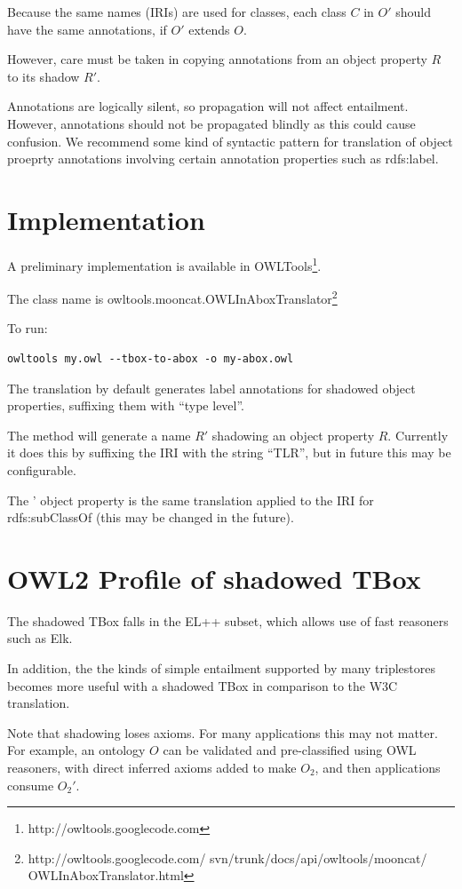 \documentclass{my}
\def\SubClassOf{\pr{SubClassOf}}
\begin{document}
Because the same names (IRIs) are used for classes, each class $C$ in
$O'$ should have the same annotations, if $O'$ extends $O$.

However, care must be taken in copying annotations from an object
property $R$ to its shadow $R'$.

Annotations are logically silent, so propagation will not affect
entailment. However, annotations should not be propagated blindly as
this could cause confusion. We recommend some kind of syntactic
pattern for translation of object proeprty annotations involving
certain annotation properties such as rdfs:label.

\section{Implementation}

A preliminary implementation is available in
OWLTools\footnote{http://owltools.googlecode.com}.

The class name is
owltools.mooncat.OWLInAboxTranslator\footnote{http://owltools.googlecode.com/ 
svn/trunk/docs/api/owltools/mooncat/ OWLInAboxTranslator.html}

To run:
\begin{verbatim}
owltools my.owl --tbox-to-abox -o my-abox.owl
\end{verbatim}

The translation by default generates label annotations for shadowed
object properties, suffixing them with ``type level''.

The method  will generate a name $R'$ shadowing an
object property $R$. Currently it does this by suffixing the IRI with
the string ``TLR'', but in future this may be configurable.

The \SubClassOf' object property is the same translation applied to
the IRI for rdfs:subClassOf (this may be changed in the future).

\section{OWL2 Profile of shadowed TBox}

The shadowed TBox falls in the EL++ subset, which allows use of fast
reasoners such as Elk.

In addition, the the kinds of simple entailment supported by many
triplestores becomes more useful with a shadowed TBox in comparison to
the W3C translation.

Note that shadowing loses axioms. For many applications this may not
matter. For example, an ontology $O$ can be validated and
pre-classified using OWL reasoners, with direct inferred axioms added
to make $O_2$, and then applications consume $O_2'$.
\end{document}
